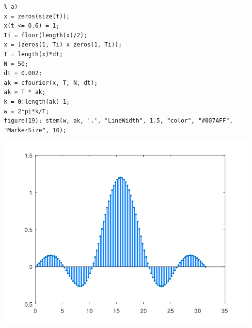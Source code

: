 \documentclass{article}
\begin{document}
\begin{enumerate}[leftmargin=*]
\begin{enumerate}[label=\roman*)]
\begin{lstlisting}
% a)
x = zeros(size(t));
x(t <= 0.6) = 1;
Ti = floor(length(x)/2);
x = [zeros(1, Ti) x zeros(1, Ti)];
T = length(x)*dt;
N = 50;
dt = 0.002;
ak = cfourier(x, T, N, dt);
ak = T * ak;
k = 0:length(ak)-1;
w = 2*pi*k/T;
figure(19); stem(w, ak, '.', "LineWidth", 1.5, "color", "#007AFF", "MarkerSize", 10);
\end{lstlisting}
\begin{center}
\includegraphics[width=0.5\linewidth]{Imágenes/Figura19}
\end{center}


\end{enumerate}
\end{enumerate}
\end{document}
